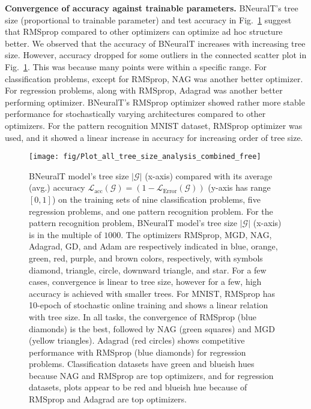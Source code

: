 \documentclass[11pt,a4paper]{article}
\begin{document}
    
    \textbf{Convergence of accuracy against trainable parameters.} BNeuralT's tree size (proportional to trainable parameter) and test accuracy in Fig.~\ref{fig:BneuralT_tree_size_vs_acc} suggest that RMSprop compared to other optimizers can optimize ad hoc structure better. We observed that the accuracy of BNeuralT increases with increasing tree size. However, accuracy dropped for some outliers in the connected scatter plot in Fig.~\ref{fig:BneuralT_tree_size_vs_acc}. This was because many points were within a specific range.  For classification problems, except for RMSprop, NAG was another better optimizer. For regression problems, along with RMSprop, Adagrad was another better performing optimizer. BNeuralT's RMSprop optimizer showed rather more stable performance for stochastically varying architectures compared to other optimizers. 
    For the pattern recognition MNIST dataset, RMSprop optimizer was used, and it showed a linear increase in accuracy for increasing order of tree size.
    
    
    \begin{figure}[]
        \centering
        \texttt{[image: fig/Plot\_all\_tree\_size\_analysis\_combined\_free]}
        \caption{BNeuralT model's tree size $|\mathcal{G}|$ (x-axis) compared with its average (avg.) accuracy $\mathcal{L}_{\text{acc}}(\mathcal{G}) = (1 - \mathcal{L}_{\text{Error}}(\mathcal{G}))$ (y-axis has range $[0,1]$) on the training sets of nine classification problems, five regression problems, and one pattern recognition problem.  For the pattern recognition problem, BNeuralT model's tree size $|\mathcal{G}|$ (x-axis) is in the multiple of $1000$. The optimizers RMSprop, MGD, NAG, Adagrad, GD, and Adam are respectively indicated in blue, orange, green, red, purple, and brown colors, respectively, with symbols diamond, triangle, circle, downward triangle, and star.  For a few cases, convergence is linear to tree size, however for a few, high accuracy is achieved with smaller trees. For MNIST, RMSprop has 10-epoch of stochastic online training and shows a linear relation with tree size. In all tasks, the convergence of RMSprop (blue diamonds) is the best, followed by NAG (green squares) and MGD (yellow triangles). Adagrad (red circles) shows competitive performance with  RMSprop (blue diamonds) for regression problems. Classification datasets have green and blueish hues because NAG and RMSprop are top optimizers, and for regression datasets, plots appear to be red and blueish hue because of RMSprop and Adagrad are top optimizers.
        \label{fig:BneuralT_tree_size_vs_acc}}
        
    \end{figure}
        
\end{document}
